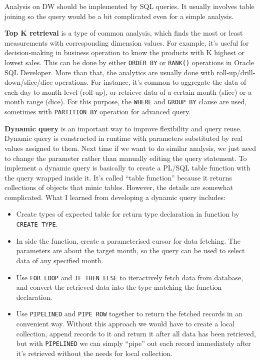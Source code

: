 \documentclass[
  a4paper,
]{article}
\providecommand{\tightlist}{%
  \setlength{\itemsep}{0pt}\setlength{\parskip}{0pt}}
\begin{document}
Analysis on DW should be implemented by SQL queries. It usually involves
table joining so the query would be a bit complicated even for a simple
analysis.

\textbf{Top K retrieval} is a type of common analysis, which finds the
most or least measurements with corresponding dimension values. For
example, it's useful for decision-making in business operation to know
the products with K highest or lowest sales. This can be done by either
\texttt{ORDER\ BY} or \texttt{RANK()} operations in Oracle SQL
Developer. More than that, the analytics are usually done with
roll-up/drill-down/slice/dice operations. For instance, it's common to
aggregate the data of each day to month level (roll-up), or retrieve
data of a certain month (slice) or a month range (dice). For this
purpose, the \texttt{WHERE} and \texttt{GROUP\ BY} clause are used,
sometimes with \texttt{PARTITION\ BY} operation for advanced query.

\textbf{Dynamic query} is an important way to improve flexibility and
query reuse. Dynamic query is constructed in runtime with parameters
substituted by real values assigned to them. Next time if we want to do
similar analysis, we just need to change the parameter rather than
manually editing the query statement. To implement a dynamic query is
basically to create a PL/SQL table function with the query wrapped
inside it. It's called ``table function'' because it returns collections
of objects that minic tables. However, the details are somewhat
complicated. What I learned from developing a dynamic query includes:

\begin{itemize}
\tightlist
\item
  Create types of expected table for return type declaration in function
  by \texttt{CREATE\ TYPE}.
\item
  In side the function, create a parameterised cursor for data fetching.
  The parameters are about the target month, so the query can be used to
  select data of any specified month.
\item
  Use \texttt{FOR\ LOOP} and \texttt{IF\ THEN\ ELSE} to iteractively
  fetch data from database, and convert the retrieved data into the type
  matching the function declaration.
\item
  Use \texttt{PIPELINED} and \texttt{PIPE\ ROW} together to return the
  fetched records in an convenient way. Without this approach we would
  have to create a local collection, append records to it and return it
  after all data has been retrieved, but with \texttt{PIPELINED} we can
  simply ``pipe'' out each record immediately after it's retrieved
  without the needs for local collection.
\end{itemize}

\printbibliography
\end{document}
